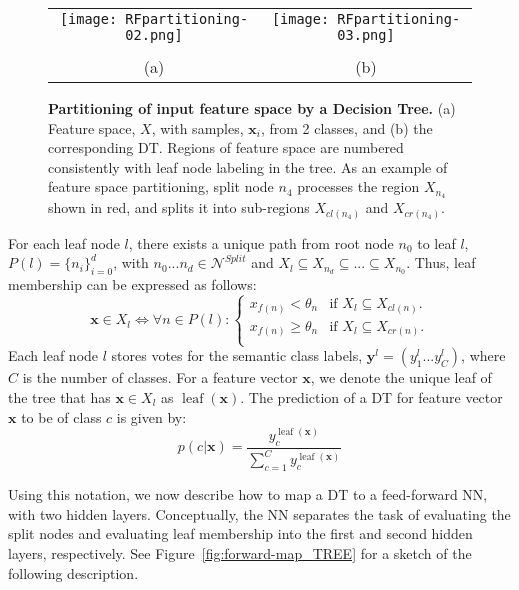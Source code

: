 \documentclass[twocolumn]{svjour3}
\DeclareMathOperator{\leaf}{leaf}
\begin{document}
\begin{figure}
\begin{center}
\begin{tabular}{cc}

   \texttt{[image: RFpartitioning-02.png]} &
   \texttt{[image: RFpartitioning-03.png]} \\ \\
				   (a) & (b)
\end{tabular}
\end{center}
   \caption{\textbf{Partitioning of input feature space by a Decision Tree.} (a) Feature space, $X$, with samples, $\mathbf{x}_i$, from 2 classes, and (b) the corresponding DT.  Regions of feature space are numbered consistently with leaf node labeling in the tree.  As an example of feature space partitioning, split node $n_4$ processes the region $X_{n_4}$ shown in red, and splits it into sub-regions $X_{cl(n_4)}$ and $X_{cr(n_4)}$.}
\label{fig:RFpartitioning}
\end{figure}


For each leaf node $l$, there exists a unique path from root node $n_0$ to leaf $l$, $P(l)=\{n_i\}_{i=0}^d$, with $n_0...n_d \in \mathcal{N}^{Split}$ and $X_l \subseteq X_{n_d} \subseteq ... \subseteq X_{n_0}$.
Thus, leaf membership can be expressed as follows:
%
\begin{equation}
\mathbf{x} \in X_l \Longleftrightarrow \forall n \in P(l) : \begin{cases}
x_{f(n)} < \theta_n & \text{if $X_l \subseteq X_{cl(n)}$}.\\
x_{f(n)} \geq \theta_n & \text{if $X_l \subseteq X_{cr(n)}$}.\\
\end{cases}
\label{eq:rf:leaf-membership}
\end{equation}
%
Each leaf node $l$ stores votes for the semantic class labels, $\mathbf{y}^l = (y^l_1...y^l_{C})$, where $C$ is the number of classes.
%
For a feature vector $\mathbf{x}$, we denote the unique leaf of the tree that has $\mathbf{x}\in X_l$ as $\leaf(\mathbf{x})$.
%
The prediction of a DT for feature vector $\mathbf{x}$ to be of class $c$ is given by:
\begin{equation}
p(c | \mathbf{x}) = \frac{y^{\leaf(\mathbf{x})}_c}{\sum_{c=1}^{C}y^{\leaf(\mathbf{x})}_c} 
\label{eq:dt:prediction}
\end{equation}

Using this notation, we now describe how to map a DT to a feed-forward NN, with two hidden layers.
%
Conceptually, the NN separates the task of evaluating the split nodes and evaluating leaf membership into the first and second hidden layers, respectively. 
See
Figure~\ref{fig:forward-map_TREE}
for a sketch of the following description.
\end{document}
